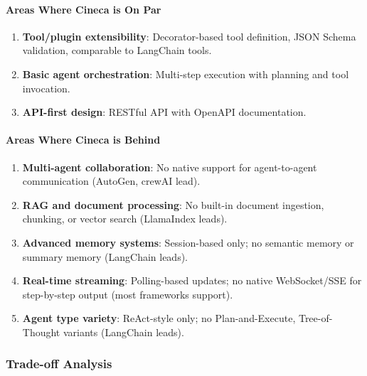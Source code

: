 \paragraph{Areas Where Cineca is On Par}
\begin{enumerate}
    \item \textbf{Tool/plugin extensibility}: Decorator-based tool definition, JSON Schema validation, comparable to LangChain tools.
    
    \item \textbf{Basic agent orchestration}: Multi-step execution with planning and tool invocation.
    
    \item \textbf{API-first design}: RESTful API with OpenAPI documentation.
\end{enumerate}

\paragraph{Areas Where Cineca is Behind}
\begin{enumerate}
    \item \textbf{Multi-agent collaboration}: No native support for agent-to-agent communication (AutoGen, crewAI lead).
    
    \item \textbf{RAG and document processing}: No built-in document ingestion, chunking, or vector search (LlamaIndex leads).
    
    \item \textbf{Advanced memory systems}: Session-based only; no semantic memory or summary memory (LangChain leads).
    
    \item \textbf{Real-time streaming}: Polling-based updates; no native WebSocket/SSE for step-by-step output (most frameworks support).
    
    \item \textbf{Agent type variety}: ReAct-style only; no Plan-and-Execute, Tree-of-Thought variants (LangChain leads).
\end{enumerate}

\subsubsection{Trade-off Analysis}

